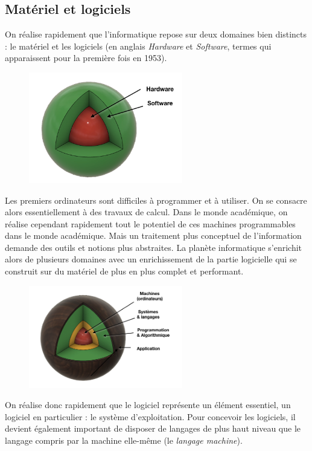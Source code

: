 \documentclass[a4paper,11pt]{book}
\begin{document}
\subsection{Matériel et logiciels}
On réalise rapidement que l'informatique repose sur deux domaines bien distincts : le matériel et les logiciels (en anglais \textit{Hardware} et \textit{Software}, termes qui apparaissent pour la première fois en 1953).
\begin{figure}[h]
    \centering
    \includegraphics[width=0.6\textwidth]{media/infographies/planete_HS.png}
\end{figure}
Les premiers ordinateurs sont difficiles à programmer et à utiliser. On se consacre alors essentiellement à des travaux de calcul. Dans le monde académique, on réalise cependant rapidement tout le potentiel de ces machines programmables dans le monde académique. Mais un traitement plus conceptuel de l'information demande des outils et notions plus abstraites. La planète informatique s'enrichit alors de plusieurs domaines avec un enrichissement de la partie logicielle qui se construit sur du matériel de plus en plus complet et performant.

\begin{figure}[h]
    \centering
    \includegraphics[width=0.6\textwidth]{media/infographies/planeteInfo.png}
\end{figure}

On réalise donc rapidement que le logiciel représente un élément essentiel, un logiciel en particulier : le système d'exploitation. Pour concevoir les logiciels, il devient également important de disposer de langages de plus haut niveau que le langage compris par la machine elle-même (le \textit{langage machine}).
\end{document}
